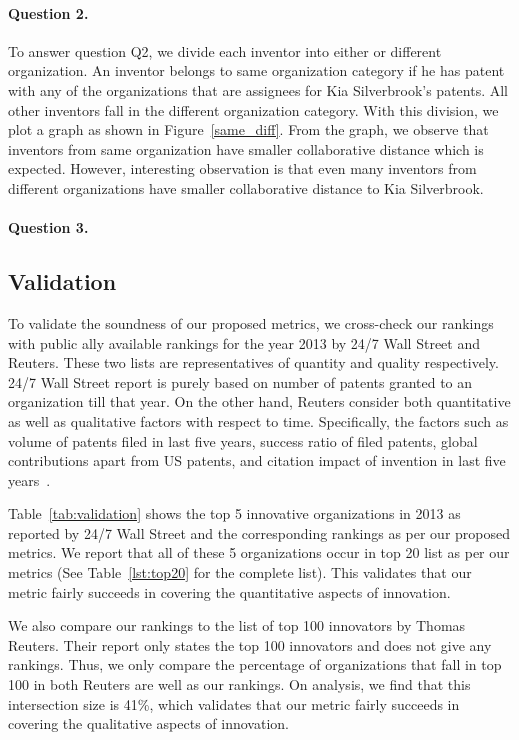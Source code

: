 \paragraph{Question 2.}
To answer question Q2, we divide each inventor into either
or different organization. An inventor belongs to 
 same organization category if he has patent with any of the organizations that are 
assignees for Kia Silverbrook's patents. All other inventors fall in the different
organization category. With this division, we plot a graph as shown in Figure~\ref{same_diff}.
From the graph, we observe that inventors from same organization have
smaller collaborative distance which is expected. However, interesting observation is that
even many inventors from different organizations have smaller collaborative distance to Kia Silverbrook. 

\paragraph{Question 3.}


\subsection{Validation}

To validate the soundness of our proposed metrics, we cross-check our rankings
with public ally available rankings for the year 2013 by 24/7 Wall Street and
Reuters. These two lists are representatives of quantity and quality
respectively.  24/7 Wall Street report is purely based on number of patents
granted to an organization till that year.  On the other hand, Reuters
consider both quantitative as well as qualitative factors with respect to
time. Specifically, the factors such as volume of patents filed in last five
years, success ratio of filed patents, global contributions apart from US
patents, and citation impact of invention in last five years~\cite{reuters-method}.

Table~\ref{tab:validation} shows the top 5 innovative organizations in 2013 as
reported by 24/7 Wall Street and the corresponding rankings as per our
proposed metrics. We report that all of these 5 organizations occur in top 20
list as per our metrics (See Table~\ref{lst:top20} for the complete list).
This validates that our metric fairly succeeds in covering the quantitative
aspects of innovation.

We also compare our rankings to the list of top 100 innovators by Thomas
Reuters. Their report only states the top 100 innovators and does not give any
rankings. Thus, we only compare the percentage of organizations that fall in
top 100 in both Reuters are well as our rankings. On analysis, we find that
this intersection size is 41\%, which validates that our metric fairly
succeeds in covering the qualitative aspects of innovation.

